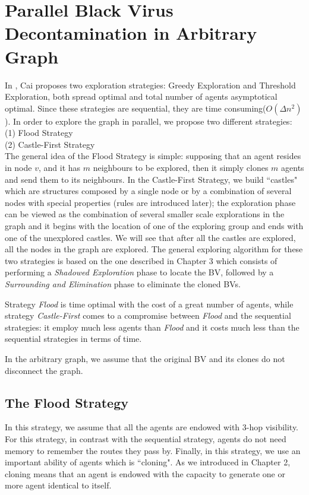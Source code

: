 \chapter {Parallel Black Virus Decontamination in Arbitrary Graph}
\label{TL}


In \cite{cai}, Cai proposes two exploration strategies: Greedy Exploration and Threshold Exploration, both spread optimal and total number of agents asymptotical optimal. Since these strategies are sequential, they are time consuming($O(\Delta n^2)$).  In order to explore the graph in parallel, we propose two different strategies: \\
(1) Flood Strategy\\
(2) Castle-First Strategy\\
The general idea of the Flood Strategy is simple: supposing that an agent resides in node $v$, and it has $m$ neighbours  to be explored, then it simply clones $m$ agents and send them to its neighbours. In the Castle-First Strategy, we build ``castles" which are structures composed by  a single node or by a combination of several nodes with special properties (rules are introduced later); the exploration phase can be viewed as the combination of several smaller scale explorations in the graph and it begins with the location of one of the exploring group and ends with one of the unexplored castles. We will see that after all the castles are explored, all the nodes in the graph are explored. The general exploring algorithm for these two strategies is based on the one described in Chapter 3 which consists of performing a {\em Shadowed Exploration} phase to locate the BV, followed by a {\em Surrounding and Elimination} phase to eliminate the cloned BVs. 

Strategy {\em Flood}  is time optimal with the cost of a great number of agents,
 while strategy {\em Castle-First} comes to a compromise between  {\em Flood} and the sequential strategies: it employ much less agents than  {\em Flood} and it costs much less  than the sequential strategies in terms of time. 

 In the arbitrary graph, we assume that  the original BV and its clones do not disconnect the graph.

\section{The Flood Strategy}
In this strategy, we assume that all the agents are endowed with 3-hop visibility. For this strategy, in contrast with the sequential strategy, agents   do not need memory to remember the routes they pass by.  Finally, in this strategy, we use an important ability of agents which is ``cloning". As we introduced in Chapter 2, cloning means that an agent is endowed with the capacity to generate one or more agent identical to itself. 

